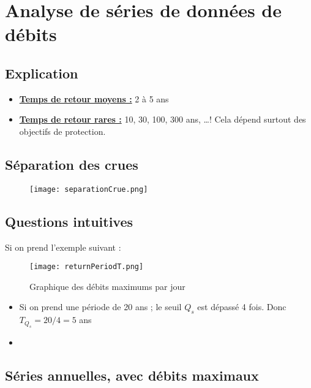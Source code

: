 \chapter{Analyse de séries de données de débits}

\section{Explication}
\begin{itemize}
    \item \underline{\textbf{Temps de retour moyens :}} 2 à 5 ans
    \item \underline{\textbf{Temps de retour rares :}} 10, 30, 100, 300 ans, \dots ! Cela dépend surtout des objectifs de protection.
\end{itemize}

\section{Séparation des crues}
\begin{figure}[H]
    \centering
    \texttt{[image: separationCrue.png]}
    \label{fig:separationCrues}
\end{figure}

\newpage

\section{Questions intuitives}
Si on prend l'exemple suivant :
\begin{figure}[h!]
    \centering
    \texttt{[image: returnPeriodT.png]}
    \caption{Graphique des débits maximums par jour}
    \label{fig:graphiqueExemple}
\end{figure}

\begin{itemize}
    \item Si on prend une période de 20 ans ; le seuil $Q_s$ est dépassé 4 fois. Donc $T_{Q_{s}} = 20/4 = 5$ ans
    \item 
\end{itemize}


\section{Séries annuelles, avec débits maximaux}

